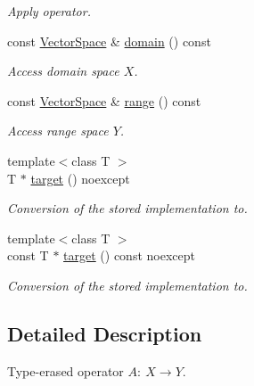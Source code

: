 \begin{DoxyCompactItemize}
\begin{DoxyCompactList}\small\item\em Apply operator. \end{DoxyCompactList}\item 
const \hyperlink{classSpacy_1_1VectorSpace}{Vector\+Space} \& \hyperlink{classSpacy_1_1Operator_a3b3d457bee48adf00d683a6aec4aa841}{domain} () const \hypertarget{classSpacy_1_1Operator_a3b3d457bee48adf00d683a6aec4aa841}{}\label{classSpacy_1_1Operator_a3b3d457bee48adf00d683a6aec4aa841}

\begin{DoxyCompactList}\small\item\em Access domain space $X$. \end{DoxyCompactList}\item 
const \hyperlink{classSpacy_1_1VectorSpace}{Vector\+Space} \& \hyperlink{classSpacy_1_1Operator_a8cf3b1e3b6c5c6ab5ddc09224ed8ab24}{range} () const \hypertarget{classSpacy_1_1Operator_a8cf3b1e3b6c5c6ab5ddc09224ed8ab24}{}\label{classSpacy_1_1Operator_a8cf3b1e3b6c5c6ab5ddc09224ed8ab24}

\begin{DoxyCompactList}\small\item\em Access range space $Y$. \end{DoxyCompactList}\item 
{\footnotesize template$<$class T $>$ }\\T $\ast$ \hyperlink{classSpacy_1_1Operator_afabc47b5debc681bb985865adc0e9fa1}{target} () noexcept
\begin{DoxyCompactList}\small\item\em Conversion of the stored implementation to. \end{DoxyCompactList}\item 
{\footnotesize template$<$class T $>$ }\\const T $\ast$ \hyperlink{classSpacy_1_1Operator_af4f5fc9968599011c56a59665fe42e0a}{target} () const noexcept
\begin{DoxyCompactList}\small\item\em Conversion of the stored implementation to. \end{DoxyCompactList}\end{DoxyCompactItemize}


\subsection{Detailed Description}
Type-\/erased operator $A:\ X \to Y $. 

